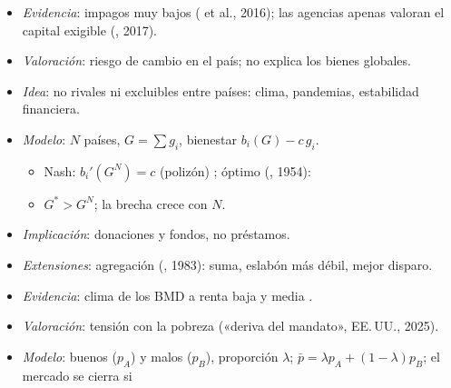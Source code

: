 \documentclass{article}
\begin{document}
\begin{columnas}
\begin{itemize}
  \begin{itemize}
  \item {}: perpetuo y subordinado; cuenta como patrimonio.
  \item BIRF: 20 $\to$ 19\,\% (2023) $\to$ 18\,\% (2024); híbrido de 12~accionistas ; BAfD, primer híbrido en el mercado (2024); FMI: comprarlo con DEG.
  \end{itemize}
\item \emph{Evidencia}: impagos muy bajos ( et al., 2016); las agencias apenas valoran el capital exigible (, 2017).
\item \emph{Valoración}: riesgo de cambio en el país; no explica los bienes globales.
\end{itemize}
\begin{itemize}
\item \emph{Idea}: no rivales ni excluibles entre países: clima, pandemias, estabilidad financiera.
\item \emph{Modelo}: $N$ países, $G=\sum g_i$, bienestar $b_i(G)-c\,g_i$.
  \begin{itemize}
  \item Nash: $b_i'(G^N)=c$ (polizón) ; óptimo (, 1954):
  \end{itemize}
  \begin{itemize}
  \item $G^*>G^N$; la brecha crece con $N$.
  \end{itemize}
\end{itemize}
\begin{itemize}
\item \emph{Implicación}: donaciones y fondos, no préstamos.
\item \emph{Extensiones}: agregación (, 1983): suma, eslabón más débil, mejor disparo.
\item \emph{Evidencia}: clima de los BMD a renta baja y media .
\item \emph{Valoración}: tensión con la pobreza («deriva del mandato», EE.\,UU., 2025).
\end{itemize}
\begin{itemize}
\item \emph{Modelo}: buenos ($p_A$) y malos ($p_B$), proporción $\lambda$; $\bar p=\lambda p_A+(1-\lambda)p_B$; el mercado se cierra si

\end{itemize}
\end{columnas}
\end{document}
